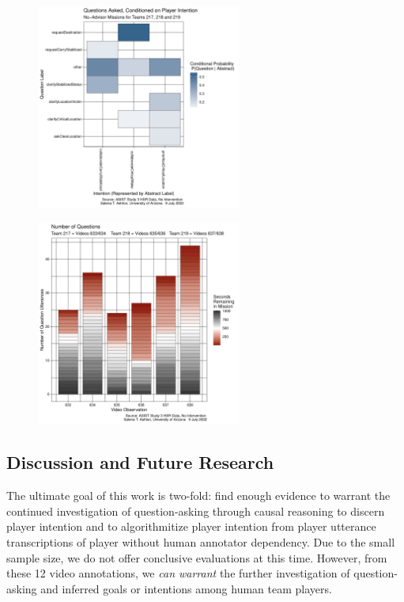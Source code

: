 \documentclass[10pt]{article}
\begin{document}
\begin{figure}[h!]
    \centering
    \includegraphics[width=0.6\textwidth]{../figures/questionLabel_ConditionalProbability_STA.pdf}
    \caption{ }
\end{figure}




\begin{figure}[h!]
    \centering
    \includegraphics[width=0.6\textwidth]{../figures/QuestionTiming_STA.pdf}
    \caption{ }
\end{figure}

\clearpage












\subsection{Discussion and Future Research}
The ultimate goal of this work is two-fold: find enough evidence to warrant the continued investigation of question-asking through causal reasoning to discern player intention and to algorithmitize player intention from player utterance transcriptions of player without human annotator dependency. Due to the small sample size, we do not offer conclusive evaluations at this time. However, from these 12 video annotations, we \emph{can warrant} the further investigation of question-asking and inferred goals or intentions among human team players.
\end{document}
